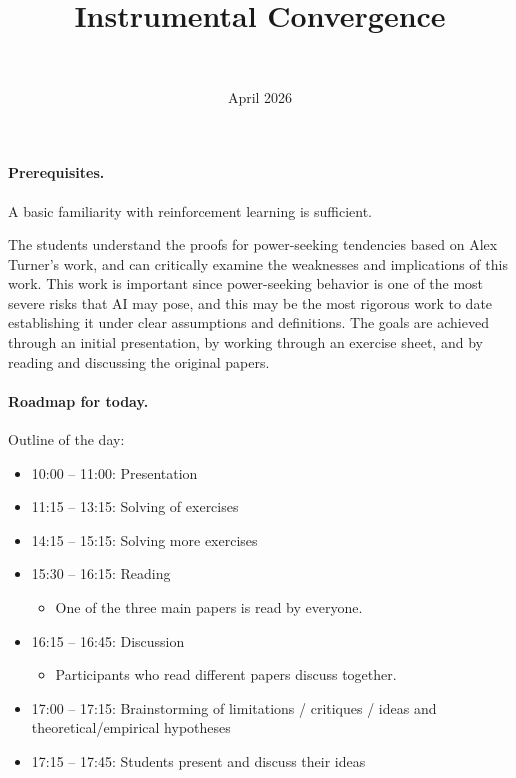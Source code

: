 \documentclass[11pt]{article}
\title{Instrumental Convergence}
\author{\authorname{Leon Lang}\\ \affiliation{Iliad}}
\date{April 2026}
\begin{document}
\maketitle

\paragraph{Prerequisites.}

A basic familiarity with reinforcement learning is sufficient.

\begin{learningoutcomes}
The students understand the proofs for power-seeking tendencies based on Alex
Turner's work, and can critically examine the weaknesses and implications of
this work. This work is important since power-seeking behavior is one of the
most severe risks that AI may pose, and this may be the most rigorous work to
date establishing it under clear assumptions and definitions. The goals are
achieved through an initial presentation, by working through an exercise sheet,
and by reading and discussing the original papers.
\end{learningoutcomes}

\paragraph{Roadmap for today.}

Outline of the day:

\begin{itemize}
  \item 10:00 -- 11:00: Presentation
  \item 11:15 -- 13:15: Solving of exercises
  \item 14:15 -- 15:15: Solving more exercises
  \item 15:30 -- 16:15: Reading
\begin{itemize}
  \item One of the three main papers is read by everyone.
\end{itemize}
  \item 16:15 -- 16:45: Discussion
\begin{itemize}
  \item Participants who read different papers discuss together.
\end{itemize}
  \item 17:00 -- 17:15: Brainstorming of limitations / critiques / ideas and theoretical/empirical hypotheses
  \item 17:15 -- 17:45: Students present and discuss their ideas
\end{itemize}
\end{document}
